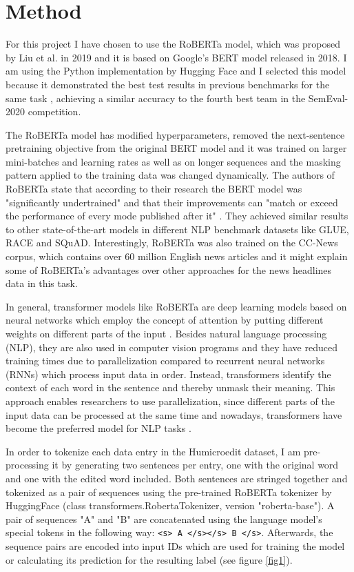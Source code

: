 \documentclass[11pt,a4paper,onecolumn,oneside,notitlepage]{article}
\begin{document}
	\section{Method}
	For this project I have chosen to use the RoBERTa model, which was proposed by Liu et al. in 2019 \citep{DBLP:journals/corr/abs-1907-11692} and it is based on Google's BERT model released in 2018. I am using the Python implementation by Hugging Face \citep{wolf-etal-2020-transformers} and I selected this model because it demonstrated the best test results in previous benchmarks for the same task \citep{DBLP:journals/corr/abs-2008-00304}, achieving a similar accuracy to the fourth best team in the SemEval-2020 competition.

	The RoBERTa model has modified hyperparameters, removed the next-sentence pretraining objective from the original BERT model and it was trained on larger mini-batches and learning rates as well as on longer sequences and the masking pattern applied to the training data was changed dynamically. The authors of RoBERTa state that according to their research the BERT model was "significantly undertrained" and that their improvements can "match or exceed the performance of every mode published after it" \citep{DBLP:journals/corr/abs-1907-11692}. They achieved similar results to other state-of-the-art models in different NLP benchmark datasets like GLUE, RACE and SQuAD. Interestingly, RoBERTa was also trained on the CC-News corpus, which contains over 60 million English news articles and it might explain some of RoBERTa's advantages over other approaches for the news headlines data in this task.

	In general, transformer models like RoBERTa are deep learning models based on neural networks which employ the concept of attention by putting different weights on different parts of the input \citep{DBLP:journals/corr/VaswaniSPUJGKP17}. Besides natural language processing (NLP), they are also used in computer vision programs and they have reduced training times due to parallelization compared to recurrent neural networks (RNNs) which process input data in order. Instead, transformers identify the context of each word in the sentence and thereby unmask their meaning. This approach enables researchers to use parallelization, since different parts of the input data can be processed at the same time and nowadays, transformers have become the preferred model for NLP tasks \citep{wolf-etal-2020-transformers}.

	In order to tokenize each data entry in the Humicroedit dataset, I am pre-processing it by generating two sentences per entry, one with the original word and one with the edited word included. Both sentences are stringed together and tokenized as a pair of sequences using the pre-trained RoBERTa tokenizer by HuggingFace (class transformers.RobertaTokenizer, version "roberta-base"). A pair of sequences "A" and "B" are concatenated using the language model's special tokens in the following way: \verb|<s> A </s></s> B </s>|. Afterwards, the sequence pairs are encoded into input IDs which are used for training the model or calculating its prediction for the resulting label (see figure \ref{fig1}).
\end{document}
